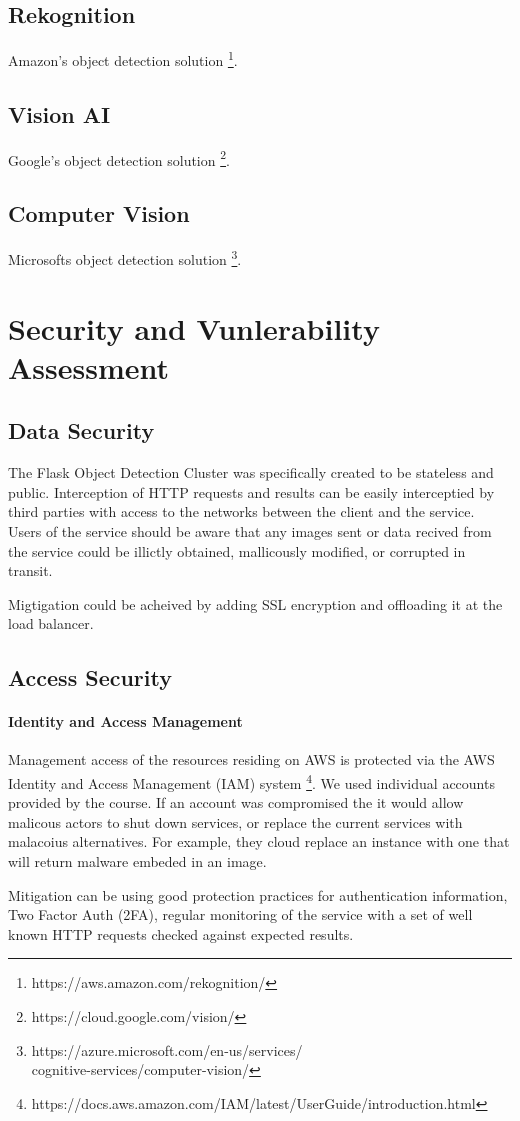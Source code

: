 \documentclass[conference]{IEEEtran}
\begin{document}
\subsection{Rekognition}
Amazon's object detection solution \footnote{https://aws.amazon.com/rekognition/}.
\subsection{Vision AI}
Google's object detection solution \footnote{https://cloud.google.com/vision/}.
\subsection{Computer Vision}
Microsofts object detection solution \footnote{https://azure.microsoft.com/en-us/services/\\cognitive-services/computer-vision/}.

\section{Security and Vunlerability Assessment}
\subsection{Data Security}
The Flask Object Detection Cluster was specifically created to be stateless and public. Interception of HTTP requests and results can be easily interceptied by third parties with access to the networks between the client and the service. Users of the service should be aware that any images sent or data recived from the service could be illictly obtained, mallicously modified, or corrupted in transit. \par
Migtigation could be acheived by adding SSL encryption and offloading it at the load balancer.
\subsection{Access Security}
\paragraph{Identity and Access Management}
Management access of the resources residing on AWS is protected via the AWS Identity and Access Management (IAM) system \footnote{https://docs.aws.amazon.com/IAM/latest/UserGuide/introduction.html}. We used individual accounts provided by the course. If an account was compromised the it would allow malicous actors to shut down services, or replace the current services with malacoius alternatives. For example, they cloud replace an instance with one that will return malware embeded in an image. \par
Mitigation can be using good protection practices for authentication information, Two Factor Auth (2FA), regular monitoring of the service with a set of well known HTTP requests checked against expected results.
\end{document}
